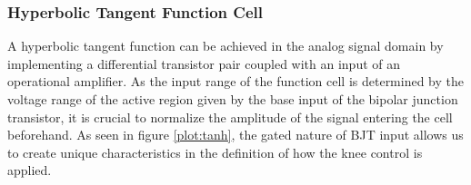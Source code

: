 \documentclass[10pt]{article}
\begin{document}
\begin{multicols*}{2}
\begin{minipage}{\linewidth}

                            \label{fig:pwr-mng}

                        \end{minipage}


                \subsubsection{Hyperbolic Tangent Function Cell}

                    A hyperbolic tangent function can be achieved in the analog signal domain by implementing a differential transistor pair coupled with an input of an operational amplifier.
                    As the input range of the function cell is determined by the voltage range of the active region given by the base input of the bipolar junction transistor, it is crucial to normalize the amplitude of the signal entering the cell beforehand. As seen in figure \ref{plot:tanh}, the gated nature of BJT input allows us to create unique characteristics in the definition of how the knee control is applied.


\end{multicols*}
\end{document}
